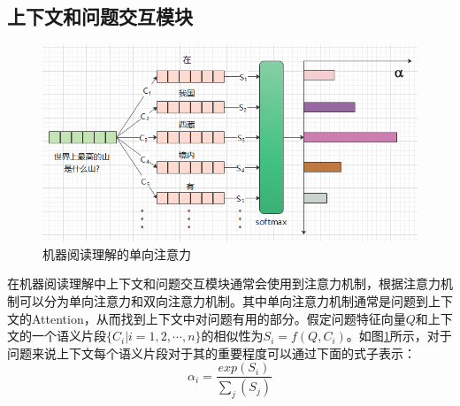 \documentclass[twoside,a4paper,12pt]{book}%
\begin{document}
\subsection{上下文和问题交互模块}
\begin{figure}[htbp]
\begin{center}
\includegraphics[width=5.6in]{figures/mrc_att1.png}
\caption{机器阅读理解的单向注意力} 
\label{fig:mrc_att1}
\end{center}
\end{figure}
在机器阅读理解中上下文和问题交互模块通常会使用到注意力机制，根据注意力机制可以分为单向注意力和双向注意力机制。其中单向注意力机制通常是问题到上下文的Attention，从而找到上下文中对问题有用的部分。假定问题特征向量$Q$和上下文的一个语义片段$\{C_i|i=1,2,\cdots,n\}$的相似性为$S_i=f(Q,C_i)$。如图\ref{fig:mrc_att1}所示，对于问题来说上下文每个语义片段对于其的重要程度可以通过下面的式子表示：
$$
\alpha_{i}=\frac{exp(S_i)}{\sum_{j}(S_j)}
$$
\end{document}
